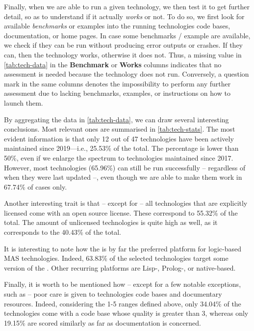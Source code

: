 \documentclass[12pt,a4paper,openright,twoside]{book}
\begin{document}
Finally, when we are able to run a given technology, we then test it to get further detail, so as to understand if it actually \emph{works} or not.
%
To do so, we first look for available \emph{benchmarks} or examples into the running technologies code bases, documentation, or home pages.
%
In case some benchmarks / example are available, we check if they can be run without producing error outputs or crashes.
%
If they can, then the technology works, otherwise it does not.
%
Thus, a missing value in \cref{tab:tech-data} in the \textbf{Benchmark} or \textbf{Works} columns indicates that no assessment is needed because the technology does not run.
%
Conversely, a question mark in the same columns denotes the impossibility to perform any further assessment due to lacking benchmarks, examples, or instructions on how to launch them.



By aggregating the data in \cref{tab:tech-data}, we can draw several interesting conclusions.
%
Most relevant ones are summarised in \cref{tab:tech-stats}.
%
The most evident information is that only 12 out of 47 technologies have been actively maintained since 2019---i.e., 25.53\% of the total.
%
The percentage is lower than 50\%, even if we enlarge the spectrum to technologies maintained since 2017.
%
However, most technologies (65.96\%) can still be run successfully -- regardless of when they were last updated --, even though we are able to make them work in 67.74\% of cases only.

Another interesting trait is that -- except for \jack{} -- all technologies that are explicitly licensed come with an open source license.
%
These correspond to 55.32\% of the total.
%
The amount of unlicensed technologies is quite high as well, as it corresponds to the 40.43\% of the total.

It is interesting to note how the \jvm{} is by far the preferred platform for logic-based MAS technologies.
%
Indeed, 63.83\% of the selected technologies target some version of the \jvm{}.
%
Other recurring platforms are Lisp-, Prolog-, or native-based.

Finally, it is worth to be mentioned how -- except for a few notable exceptions, such as \jason{} -- poor care is given to technologies code bases and documentary resources.
%
Indeed, considering the 1-5 ranges defined above, only 34.04\% of the technologies come with a code base whose quality is greater than 3, whereas only 19.15\% are scored similarly as far as documentation is concerned.
\end{document}

